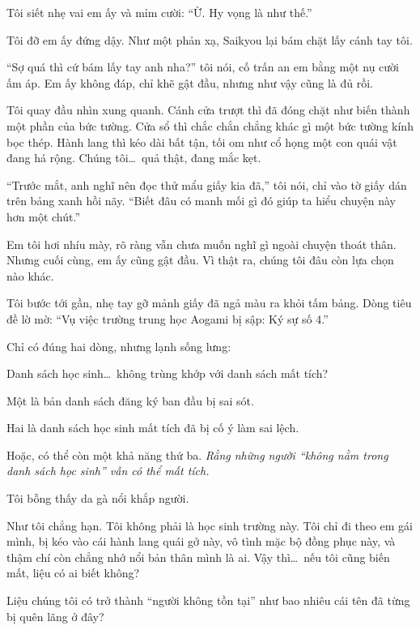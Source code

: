 \documentclass[../main.tex]{subfiles}
\begin{document}
Tôi siết nhẹ vai em ấy và mỉm cười: ``Ừ. Hy vọng là như thế.''

Tôi đỡ em ấy đứng dậy. Như một phản xạ, Saikyou lại bám chặt lấy cánh tay tôi.

``Sợ quá thì cứ bám lấy tay anh nha?'' tôi nói, cố trấn an em bằng một nụ cười ấm áp. Em ấy không đáp, chỉ khẽ gật đầu, nhưng như vậy cũng là đủ rồi.

Tôi quay đầu nhìn xung quanh. Cánh cửa trượt thì đã đóng chặt như biến thành một phần của bức tường. Cửa sổ thì chắc chắn chẳng khác gì một bức tường kính bọc thép. Hành lang thì kéo dài bất tận, tối om như cổ họng một con quái vật đang há rộng. Chúng tôi\dots\ quả thật, đang mắc kẹt.

``Trước mắt, anh nghĩ nên đọc thử mẩu giấy kia đã,'' tôi nói, chỉ vào tờ giấy dán trên bảng xanh hồi nãy. ``Biết đâu có manh mối gì đó giúp ta hiểu chuyện này hơn một chút.''

Em tôi hơi nhíu mày, rõ ràng vẫn chưa muốn nghĩ gì ngoài chuyện thoát thân. Nhưng cuối cùng, em ấy cũng gật đầu. Vì thật ra, chúng tôi đâu còn lựa chọn nào khác.

Tôi bước tới gần, nhẹ tay gỡ mảnh giấy đã ngả màu ra khỏi tấm bảng. Dòng tiêu đề lờ mờ: ``{\vnmsans Vụ việc trường trung học Aogami bị sập: Ký sự số 4.}''

Chỉ có đúng hai dòng, nhưng lạnh sống lưng:


Danh sách học sinh\dots\ không trùng khớp với danh sách mất tích?

Một là bản danh sách đăng ký ban đầu bị sai sót.

Hai là danh sách học sinh mất tích đã bị cố ý làm sai lệch.

Hoặc, có thể còn một khả năng thứ ba. \emph{Rằng những người ``không nằm trong danh sách học sinh'' vẫn có thể mất tích.}

Tôi bỗng thấy da gà nổi khắp người.

Như tôi chẳng hạn. Tôi không phải là học sinh trường này. Tôi chỉ đi theo em gái mình, bị kéo vào cái hành lang quái gở này, vô tình mặc bộ đồng phục này, và thậm chí còn chẳng nhớ nổi bản thân mình là ai. Vậy thì\dots\ nếu tôi cũng biến mất, liệu có ai biết không?

Liệu chúng tôi có trở thành ``người không tồn tại'' như bao nhiêu cái tên đã từng bị quên lãng ở đây?
\end{document}
